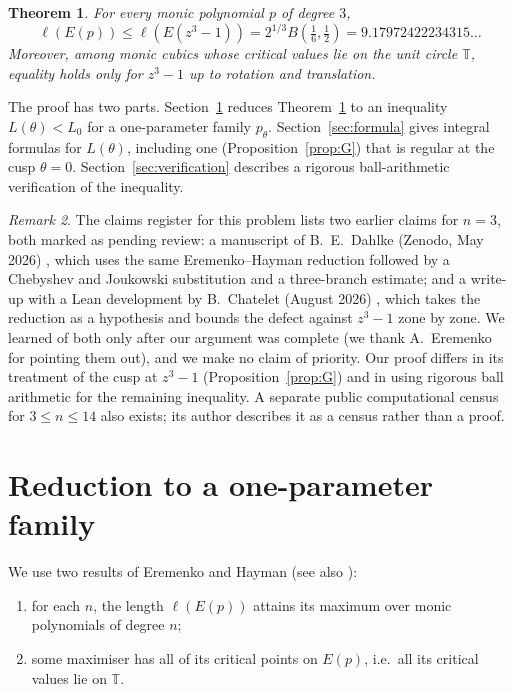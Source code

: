 \documentclass[11pt]{amsart}
\newtheorem{theorem}{Theorem}
\theoremstyle{remark}
\newtheorem{remark}[theorem]{Remark}
\newcommand{\T}{\mathbb{T}}
\begin{document}
\begin{theorem}\label{thm:main}
For every monic polynomial $p$ of degree $3$,
\[
\ell(E(p))\le \ell(E(z^3-1)) = 2^{1/3}B\!\left(\tfrac16,\tfrac12\right)=9.17972422234315\ldots
\]
Moreover, among monic cubics whose critical values lie on the unit circle $\T$, equality holds only for $z^3-1$ up to rotation and translation.
\end{theorem}

The proof has two parts. Section~\ref{sec:reduction} reduces Theorem~\ref{thm:main} to an inequality $L(\theta)<L_0$ for a one-parameter family $p_\theta$. Section~\ref{sec:formula} gives integral formulas for $L(\theta)$, including one (Proposition~\ref{prop:G}) that is regular at the cusp $\theta=0$. Section~\ref{sec:verification} describes a rigorous ball-arithmetic verification of the inequality.

\begin{remark}\label{rem:prior}
The claims register for this problem \cite{Wiki} lists two earlier claims for $n=3$, both marked as pending review: a manuscript of B.~E.~Dahlke (Zenodo, May 2026) \cite{Dah}, which uses the same Eremenko--Hayman reduction followed by a Chebyshev and Joukowski substitution and a three-branch estimate; and a write-up with a Lean development by B.~Chatelet (August 2026) \cite{Cha}, which takes the reduction as a hypothesis and bounds the defect against $z^3-1$ zone by zone. We learned of both only after our argument was complete (we thank A.~Eremenko for pointing them out), and we make no claim of priority. Our proof differs in its treatment of the cusp at $z^3-1$ (Proposition~\ref{prop:G}) and in using rigorous ball arithmetic for the remaining inequality. A separate public computational census for $3\le n\le 14$ also exists; its author describes it as a census rather than a proof.
\end{remark}

\section{Reduction to a one-parameter family}\label{sec:reduction}

We use two results of Eremenko and Hayman \cite[Lemmas 4 and 5]{EH} (see also \cite[Proposition 1.2]{Tao}):
\begin{enumerate}
\item for each $n$, the length $\ell(E(p))$ attains its maximum over monic polynomials of degree $n$;
\item some maximiser has all of its critical points on $E(p)$, i.e.\ all its critical values lie on $\T$.
\end{enumerate}
\end{document}
